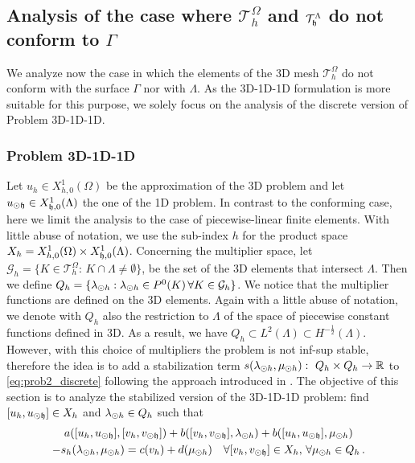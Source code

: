 \documentclass[r]{siamart171218}
\newcommand{\kent}[1]{{\color{black}#1}}
\begin{document}
\def\patch{\omega _j}
\subsection{Analysis of the case where $\mathcal{T}^{\Omega}_h$ and $\mathcal{T}^{\Lambda}_{\mathfrak{h}}$ do not conform to $\Gamma$} \label{sec:unfit2}
We analyze now the case in which the elements of the 3D mesh $\mathcal{T}^{\Omega}_h$
do not conform with the surface $\Gamma$ nor with $\Lambda$. 
As the 3D-1D-1D formulation is more suitable for this purpose,
we solely focus on the analysis of the discrete version of Problem 3D-1D-1D.

\subsubsection{Problem 3D-1D-1D} 
Let $u_h \in X_{h,0}^1(\Omega)$ be the approximation of the 3D problem
and let $u_{\odot \mathfrak{h}} \in X_{\mathfrak{h},0}^1(\Lambda)$ the one of the 1D problem.
In contrast to the conforming case, 
here we limit the analysis to the case of piecewise-linear finite elements. 
With little abuse of notation, we use the sub-index $h$ for the product space 
$X_h = X_{h,0}^1(\Omega) \times X_{\mathfrak{h},0}^1(\Lambda)$.
Concerning the multiplier space, let $\mathcal{G}_h = \{K \in \mathcal{T}^{\Omega}_h: \, K\cap \Lambda \neq \emptyset\}$, be the set of the 3D elements that intersect $\Lambda$. Then we define $Q_h=\{\lambda_{\odot h} : \lambda_{\odot h} \in P^0(K) \, \forall K \in \mathcal{G}_h\}$. We notice that the multiplier functions are defined on the 3D elements. Again with a little abuse of notation, we denote with $Q_h$ also the restriction to $\Lambda$ of the space of piecewise constant functions defined in 3D. As a result, we have $Q_h \subset L^2(\Lambda) \subset H^{-\frac12}(\Lambda)$.
However, with this choice of multipliers the problem is not inf-sup stable, therefore the idea is to add a stabilization term $s(\lambda_{\odot h}, \mu_{\odot h}): \ Q_h \times Q_h \rightarrow \mathbb{R}$ to \eqref{eq:prob2_discrete} following the approach introduced in \cite{burman2014}. 
The objective of this section is to analyze the stabilized version of the 3D-1D-1D problem: find $[u_h, \kent{\udfh]} \in X_h$ and $\lambda_{\odot h} \in Q_h$ such that
\begin{multline}\label{eq:prob2_stabilized}
a([u_h, \udfh], [v_h, \vdfh]) +
b([v_h, \vdfh], \ldh)
+ b([u_h, \udfh], \mdh)
\\
- s_h(\ldh, \mdh) 
= c(v_h) + d(\mdh)
  \quad \forall [v_h, \vdfh] \in X_h, \,
  \forall \mdh \in Q_h\,.
\end{multline}
\end{document}
